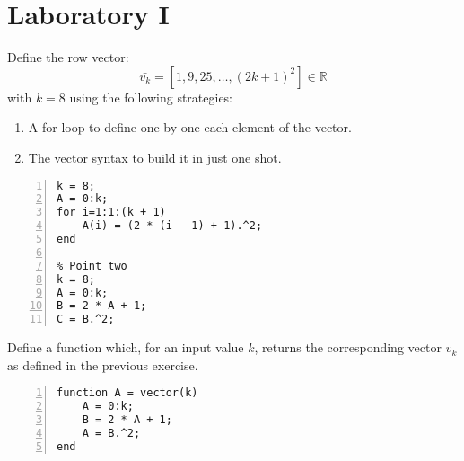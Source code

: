 \documentclass[12pt, a4paper]{report}
\newtheorem[style=M,bodystyle=\normalfont]{theorem}{Theorem}
\newtheorem[style=M,bodystyle=\normalfont]{corollary}{Corollary}
\newtheorem[style=M,bodystyle=\normalfont]{lemma}{Lemma}
\newtheorem[style=M,bodystyle=\normalfont]{definition}{Definition}
\begin{document}
\chapter{Laboratory I}
    \begin{Exercise}[label=1]
        Define the row vector: 
        \[ \bar{v_k} = [1,9,25,\dots,\left( 2k+1 \right)^2] \in \mathbb{R} \]
        with $k=8$ using the following strategies:
        \begin{enumerate}
            \item A for loop to define one by one each element of the vector.
            \item The vector syntax to build it in just one shot.
        \end{enumerate}
    \end{Exercise}
    \begin{Answer}[ref=1]
        \begin{lstlisting}[frame=single, numbers=left, style=Matlab-bw]
% Point one
k = 8;
A = 0:k;
for i=1:1:(k + 1)
    A(i) = (2 * (i - 1) + 1).^2;
end

% Point two
k = 8;
A = 0:k;
B = 2 * A + 1;
C = B.^2;
        \end{lstlisting}  
    \end{Answer}

    \newpage

    \begin{Exercise}[label=2]
        Define a function which, for an input value $k$, returns the corresponding vector $v_k$ as defined in the previous exercise.
    \end{Exercise}
    \begin{Answer}[ref=2]
        \begin{lstlisting}[frame=single, numbers=left, style=Matlab-bw]
function A = vector(k)
    A = 0:k;
    B = 2 * A + 1;
    A = B.^2;
end
        \end{lstlisting}
    \end{Answer}

    \newpage
\end{document}
